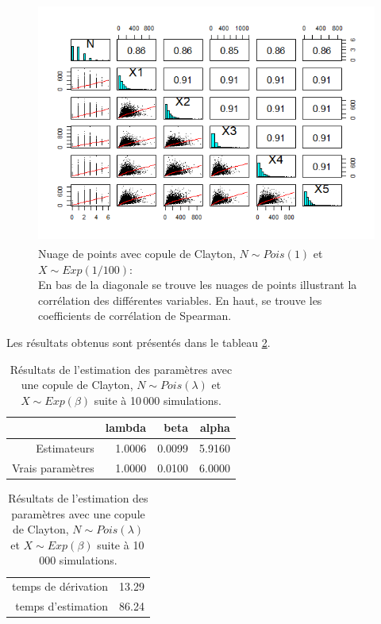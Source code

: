 \documentclass{article}
\begin{document}
	\begin{figure}[H]
		\centering
		\includegraphics[height=8cm]{Graph/scatterplot_Poisson_1.png}
		\caption[Nuage de points avec copule de Clayton, $N\sim Pois(1)$ et $X\sim Exp(1/100)$]{Nuage de points avec copule de Clayton, $N\sim Pois(1)$ et $X\sim Exp(1/100)$: \\
			En bas de la diagonale se trouve les nuages de points illustrant la corrélation des différentes variables. En haut, se trouve les coefficients de corrélation de Spearman.} 
		\label{gaph_scatterplot_Poiss_1}
	\end{figure}
	
	Les résultats obtenus sont présentés dans le tableau \ref{tbl_Clayton_Poisson}.
	
	\begin{table}[H]
		\centering
		\begin{tabular}{rrrr}
			\hline
			& lambda & beta & alpha \\ 
			\hline
			Estimateurs & 1.0006 & 0.0099 & 5.9160 \\ 
			Vrais paramètres & 1.0000 & 0.0100 & 6.0000 \\ 
			\hline
		\end{tabular}
%	
	\begin{tabular}{rr}
		\hline
		&  \\ 
		\hline
		temps de dérivation & 13.29 \\ 
		temps d'estimation & 86.24 \\ 
		\hline
	\end{tabular}
		\caption[Estimations avec une copule de Clayton et $N\sim Poisson$]{Résultats de l'estimation des paramètres avec une copule de Clayton, $N\sim Pois(\lambda)$ et $X \sim Exp(\beta)$ suite à 10\,000 simulations.}\label{tbl_Clayton_Poisson}
	\end{table}
\end{document}
